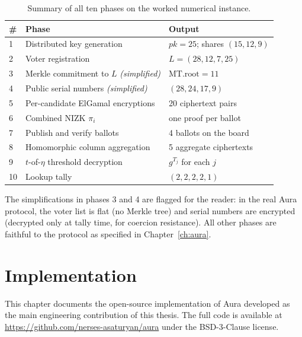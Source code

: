 \documentclass[12pt,a4paper,oneside]{report}
\begin{document}
\begin{table}[H]
\centering
\caption{Summary of all ten phases on the worked numerical instance.}
\label{tab:byhand-recap}
\small
\begin{tabular}{p{0.5cm}p{6.5cm}p{6cm}}
\toprule
\# & Phase & Output \\
\midrule
1  & Distributed key generation               & $pk = 25$; shares $(15, 12, 9)$ \\
2  & Voter registration                       & $L = (28, 12, 7, 25)$ \\
3  & Merkle commitment to $L$ \emph{(simplified)} & $\text{MT.root} = 11$ \\
4  & Public serial numbers \emph{(simplified)} & $(28, 24, 17, 9)$ \\
5  & Per-candidate ElGamal encryptions        & 20 ciphertext pairs \\
6  & Combined NIZK $\pi_i$                    & one proof per ballot \\
7  & Publish and verify ballots               & 4 ballots on the board \\
8  & Homomorphic column aggregation           & 5 aggregate ciphertexts \\
9  & $t$-of-$\eta$ threshold decryption       & $g^{T_j}$ for each $j$ \\
10 & Lookup tally                             & $(2, 2, 2, 2, 1)$ \\
\bottomrule
\end{tabular}
\end{table}

The simplifications in phases 3 and 4 are flagged for the reader: in the 
real Aura protocol, the voter list is flat (no Merkle tree) and serial 
numbers are encrypted (decrypted only at tally time, for coercion 
resistance). All other phases are faithful to the protocol as specified 
in Chapter~\ref{ch:aura}.
\chapter{Implementation}
\label{ch:implementation}

This chapter documents the open-source implementation of Aura developed 
as the main engineering contribution of this thesis. The full code is 
available at \url{https://github.com/nerses-asaturyan/aura} under the 
BSD-3-Clause license.
\end{document}
